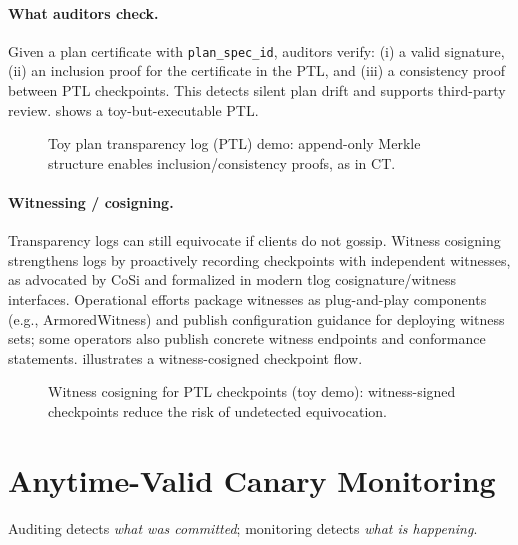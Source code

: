 \documentclass[11pt]{article}
\begin{document}
\paragraph{What auditors check.}
Given a plan certificate with \texttt{plan\_spec\_id}, auditors verify:
(i) a valid signature,
(ii) an inclusion proof for the certificate in the PTL, and
(iii) a consistency proof between PTL checkpoints.
This detects silent plan drift and supports third-party review.
 shows a toy-but-executable PTL.

\begin{figure}[t]
  \centering
  \caption{Toy plan transparency log (PTL) demo: append-only Merkle structure enables inclusion/consistency proofs, as in CT.}
  \label{fig:ptl}
\end{figure}

\paragraph{Witnessing / cosigning.}
Transparency logs can still equivocate if clients do not gossip.
Witness cosigning strengthens logs by proactively recording checkpoints with independent witnesses, as advocated by CoSi \cite{sytaCoSi2016} and formalized in modern tlog cosignature/witness interfaces.\cite{c2spTlogCosignature,c2spTlogWitness}
Operational efforts package witnesses as plug-and-play components (e.g., ArmoredWitness) and publish configuration guidance for deploying witness sets; some operators also publish concrete witness endpoints and conformance statements.\cite{armoredWitnessGithub,trustfabricWitnesses2025}
 illustrates a witness-cosigned checkpoint flow.

\begin{figure}[t]
  \centering
  \caption{Witness cosigning for PTL checkpoints (toy demo): witness-signed checkpoints reduce the risk of undetected equivocation.}
  \label{fig:witness}
\end{figure}

\section{Anytime-Valid Canary Monitoring}
Auditing detects \emph{what was committed}; monitoring detects \emph{what is happening}.
\end{document}
